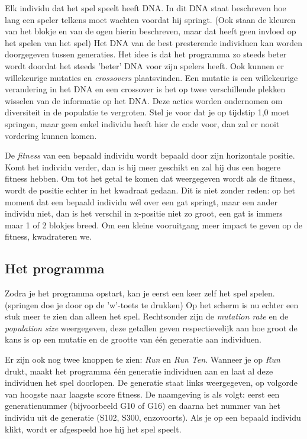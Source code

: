 Elk individu dat het spel speelt heeft DNA. In dit DNA staat beschreven hoe lang een speler telkens moet wachten voordat hij springt. (Ook staan de kleuren van het blokje en van de ogen hierin beschreven, maar dat heeft geen invloed op het spelen van het spel) Het DNA van de best presterende individuen kan worden doorgegeven tussen generaties. Het idee is dat het programma zo steeds beter wordt doordat het steeds 'beter' DNA voor zijn spelers heeft.
Ook kunnen er willekeurige mutaties en \textit{crossovers} plaatsvinden. Een mutatie is een willekeurige verandering in het DNA en een crossover is het op twee verschillende plekken wisselen van de informatie op het DNA. Deze acties worden ondernomen om diversiteit in de populatie te vergroten. Stel je voor dat je op tijdstip 1,0 moet springen, maar geen enkel individu heeft hier de code voor, dan zal er nooit vordering kunnen komen.

De \textit{fitness} van een bepaald individu wordt bepaald door zijn horizontale positie. Komt het individu verder, dan is hij meer geschikt en zal hij dus een hogere fitness hebben. Om tot het getal te komen dat weergegeven wordt als de fitness, wordt de positie echter in het kwadraat gedaan. Dit is niet zonder reden: op het moment dat een bepaald individu w\'el over een gat springt, maar een ander individu niet, dan is het verschil in x-positie niet zo groot, een gat is immers maar 1 of 2 blokjes breed. Om een kleine vooruitgang meer impact te geven op de fitness, kwadrateren we.

\subsection{Het programma}
Zodra je het programma opstart, kan je eerst een keer zelf het spel spelen. (springen doe je door op de 'w'-toets te drukken) Op het scherm is nu echter een stuk meer te zien dan alleen het spel. Rechtsonder zijn de \textit{mutation rate} en de \textit{population size} weergegeven, deze getallen geven respectievelijk aan hoe groot de kans is op een mutatie en de grootte van één generatie aan individuen.

Er zijn ook nog twee knoppen te zien: \textit{Run} en \textit{Run Ten}. Wanneer je op \textit{Run} drukt, maakt het programma één generatie individuen aan en laat al deze individuen het spel doorlopen. De generatie staat links weergegeven, op volgorde van hoogste naar laagste score fitness. De naamgeving is als volgt: eerst een generatienummer (bijvoorbeeld G10 of G16) en daarna het nummer van het individu uit de generatie (S102, S300, enzovoorts). Als je op een bepaald individu klikt, wordt er afgespeeld hoe hij het spel speelt.


